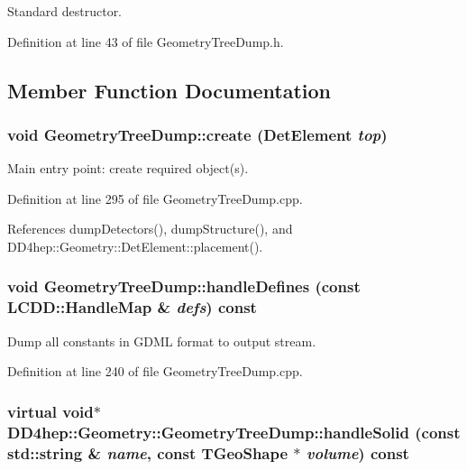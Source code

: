 Standard destructor. 

Definition at line 43 of file GeometryTreeDump.h.

\subsection{Member Function Documentation}
\hypertarget{class_d_d4hep_1_1_geometry_1_1_geometry_tree_dump_a597ecc457c64cbfdf0fe06301d2d458d}{
\subsubsection[{create}]{\setlength{\rightskip}{0pt plus 5cm}void GeometryTreeDump::create ({\bf DetElement} {\em top})}}
\label{class_d_d4hep_1_1_geometry_1_1_geometry_tree_dump_a597ecc457c64cbfdf0fe06301d2d458d}


Main entry point: create required object(s). 

Definition at line 295 of file GeometryTreeDump.cpp.

References dumpDetectors(), dumpStructure(), and DD4hep::Geometry::DetElement::placement().\hypertarget{class_d_d4hep_1_1_geometry_1_1_geometry_tree_dump_a216c679866330a96fd46c757c330e12d}{
\subsubsection[{handleDefines}]{\setlength{\rightskip}{0pt plus 5cm}void GeometryTreeDump::handleDefines (const {\bf LCDD::HandleMap} \& {\em defs}) const}}
\label{class_d_d4hep_1_1_geometry_1_1_geometry_tree_dump_a216c679866330a96fd46c757c330e12d}


Dump all constants in GDML format to output stream. 

Definition at line 240 of file GeometryTreeDump.cpp.\hypertarget{class_d_d4hep_1_1_geometry_1_1_geometry_tree_dump_a0efc1c3318733314c21d724b9f944c84}{
\subsubsection[{handleSolid}]{\setlength{\rightskip}{0pt plus 5cm}virtual void$\ast$ DD4hep::Geometry::GeometryTreeDump::handleSolid (const std::string \& {\em name}, \/  const TGeoShape $\ast$ {\em volume}) const}}
\label{class_d_d4hep_1_1_geometry_1_1_geometry_tree_dump_a0efc1c3318733314c21d724b9f944c84}


